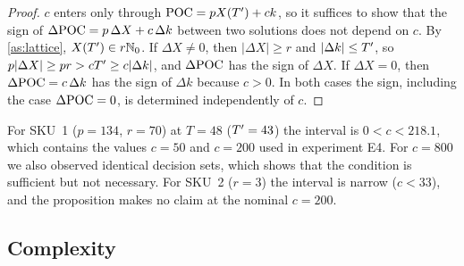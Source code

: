 \begin{proof}
  $c$ enters only through $\mathrm{POC}=pX(T')+ck$, so it suffices to show that the sign of
  $\Delta\mathrm{POC}=p\,\Delta X+c\,\Delta k$ between two solutions does not depend on $c$. By
  \cref{as:lattice}, $X(T')\in r\mathbb{N}_0$. If $\Delta X\ne0$, then
  $\lvert\Delta X\rvert\ge r$ and $\lvert\Delta k\rvert\le T'$, so
  $p\lvert\Delta X\rvert\ge p r>cT'\ge c\lvert\Delta k\rvert$, and $\Delta\mathrm{POC}$ has the
  sign of $\Delta X$. If $\Delta X=0$, then $\Delta\mathrm{POC}=c\,\Delta k$ has the sign of
  $\Delta k$ because $c>0$. In both cases the sign, including the case
  $\Delta\mathrm{POC}=0$, is determined independently of $c$.
\end{proof}

\begin{remark}
  For SKU~1 ($p=134$, $r=70$) at $T=48$ ($T'=43$) the interval is $0<c<218.1$, which
  contains the values $c=50$ and $c=200$ used in experiment E4. For $c=800$ we also
  observed identical decision sets, which shows that the condition is sufficient but not
  necessary. For SKU~2 ($r=3$) the interval is narrow ($c<33$), and the proposition makes
  no claim at the nominal $c=200$.
\end{remark}

\subsection{Complexity}\label{app:complexity}

